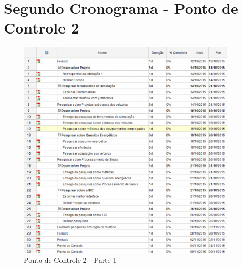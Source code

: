 \chapter[Cronograma]{Segundo Cronograma - Ponto de Controle 2}

\begin{figure}[h]
  \centering
  \includegraphics[width=400px, scale=1]{figuras/2cronograma}
  \caption{Ponto de Controle 2 - Parte 1}
\label{fig:2cronograma}
\end{figure}
